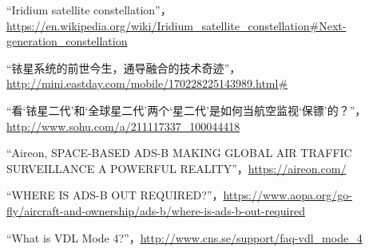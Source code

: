\begin{thebibliography}{99}
“Iridium satellite constellation”，\url{https://en.wikipedia.org/wiki/Iridium_satellite_constellation#Next-generation_constellation}

“铱星系统的前世今生，通导融合的技术奇迹”，\url{http://mini.eastday.com/mobile/170228225143989.html#}

“看‘铱星二代’和‘全球星二代’两个‘星二代’是如何当航空监视‘保镖’的？”，\url{http://www.sohu.com/a/211117337_100044418}

“Aireon, SPACE-BASED ADS-B MAKING GLOBAL AIR TRAFFIC SURVEILLANCE A POWERFUL REALITY”，\url{https://aireon.com/}

“WHERE IS ADS-B OUT REQUIRED?”，\url{https://www.aopa.org/go-fly/aircraft-and-ownership/ads-b/where-is-ads-b-out-required}

“What is VDL Mode 4?”，\url{http://www.cns.se/support/faq-vdl_mode_4}



\end{thebibliography}